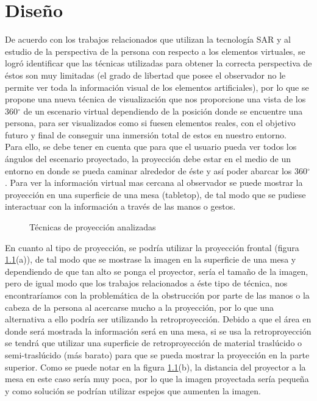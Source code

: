 \documentclass[a4paper,openright,12pt]{report}
\begin{document}
\chapter{Dise\~no}\label{cap.diseno}
De acuerdo con los trabajos relacionados que utilizan la tecnología SAR y al estudio de la perspectiva de la persona con respecto a los elementos virtuales, se logró identificar que las técnicas utilizadas para obtener la correcta perspectiva de éstos son muy limitadas (el grado de libertad que posee el observador no le permite ver toda la información visual de los elementos artificiales), por lo que se propone una nueva técnica de visualización que nos proporcione una vista de los 360$^{\circ}$ de un escenario virtual dependiendo de la posición donde se encuentre una persona, para ser visualizados como si fuesen elementos reales, con el objetivo futuro y final de conseguir una inmersión total de estos en nuestro entorno.\\
Para ello, se debe tener en cuenta que para que el usuario pueda ver todos los ángulos del escenario proyectado, la proyección debe estar en el medio de un entorno en donde se pueda caminar alrededor de éste y así poder abarcar los 360$^{\circ}$. Para ver la información virtual mas cercana al observador se puede mostrar la proyección en una superficie de una mesa (tabletop), de tal modo que se pudiese interactuar con la información a través de las manos o gestos.\\
\begin{figure}
	\centering
	\caption{Técnicas de proyección analizadas}\label{fig:tecProyeccion}
\end{figure}
En cuanto al tipo de proyección, se podría utilizar la proyección frontal (figura \ref{fig:tecProyeccion}(a)), de tal modo que se mostrase la imagen en la superficie de una mesa y dependiendo de que tan alto se ponga el proyector, sería el tamaño de la imagen, pero de igual modo que los trabajos relacionados a éste tipo de técnica, nos encontraríamos con la problemática de la obstrucción por parte de las manos o la cabeza de la persona al acercarse mucho a la proyección, por lo que una alternativa a ello podría ser utilizando la retroproyección. Debido a que el área en donde será mostrada la información será en una mesa, si se usa la retroproyección se tendrá que utilizar una superficie de retroproyección de material traslúcido o semi-traslúcido (más barato) para que se pueda mostrar la proyección en la parte superior. Como se puede notar en la figura \ref{fig:tecProyeccion}(b), la distancia del proyector a la mesa en este caso sería muy poca, por lo que la imagen proyectada sería pequeña y como solución se podrían utilizar espejos que aumenten la imagen.\\
\end{document}
